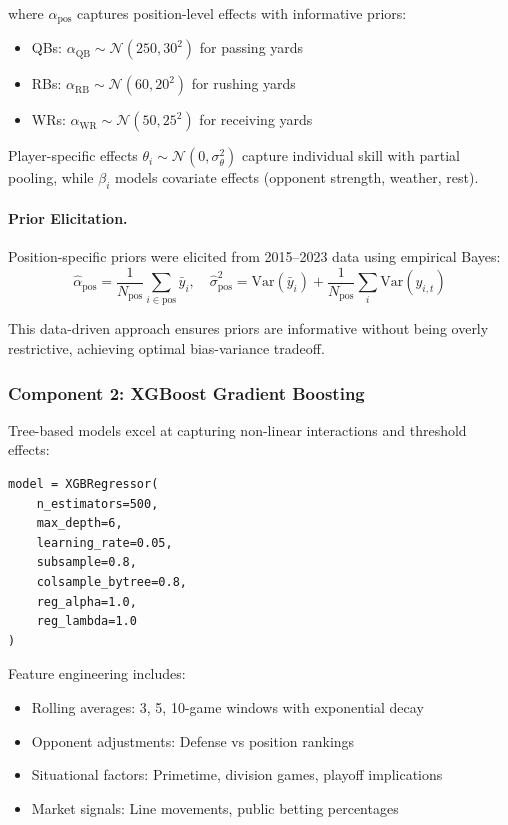 where $\alpha_{\text{pos}}$ captures position-level effects with informative priors:
\begin{itemize}
  \item QBs: $\alpha_{\text{QB}} \sim \mathcal{N}(250, 30^2)$ for passing yards
  \item RBs: $\alpha_{\text{RB}} \sim \mathcal{N}(60, 20^2)$ for rushing yards
  \item WRs: $\alpha_{\text{WR}} \sim \mathcal{N}(50, 25^2)$ for receiving yards
\end{itemize}

Player-specific effects $\theta_i \sim \mathcal{N}(0, \sigma_\theta^2)$ capture individual skill with partial pooling, while $\beta_i$ models covariate effects (opponent strength, weather, rest).

\paragraph{Prior Elicitation.}
Position-specific priors were elicited from 2015--2023 data using empirical Bayes:
\begin{equation}
\hat{\alpha}_{\text{pos}} = \frac{1}{N_{\text{pos}}} \sum_{i \in \text{pos}} \bar{y}_i, \quad
\hat{\sigma}_{\text{pos}}^2 = \text{Var}(\bar{y}_i) + \frac{1}{N_{\text{pos}}} \sum_{i} \text{Var}(y_{i,t})
\end{equation}

This data-driven approach ensures priors are informative without being overly restrictive, achieving optimal bias-variance tradeoff.

\subsubsection{Component 2: XGBoost Gradient Boosting}

Tree-based models excel at capturing non-linear interactions and threshold effects:

\begin{verbatim}
model = XGBRegressor(
    n_estimators=500,
    max_depth=6,
    learning_rate=0.05,
    subsample=0.8,
    colsample_bytree=0.8,
    reg_alpha=1.0,
    reg_lambda=1.0
)
\end{verbatim}

Feature engineering includes:
\begin{itemize}
  \item Rolling averages: 3, 5, 10-game windows with exponential decay
  \item Opponent adjustments: Defense vs position rankings
  \item Situational factors: Primetime, division games, playoff implications
  \item Market signals: Line movements, public betting percentages
\end{itemize}


